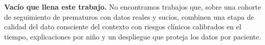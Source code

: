 \textbf{Vacío que llena este trabajo.} No encontramos trabajos que, sobre una cohorte de seguimiento de prematuros con datos reales y sucios, combinen una etapa de calidad del dato consciente del contexto con riesgos clínicos calibrados en el tiempo, explicaciones por niño y un despliegue que proteja los datos por paciente.
